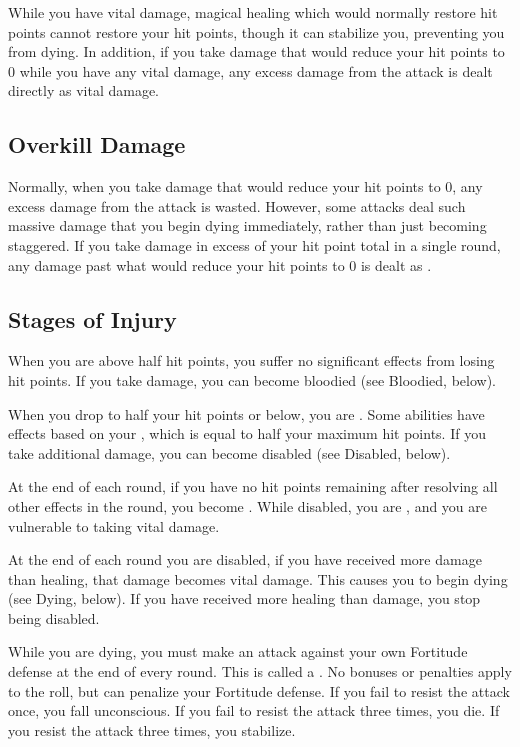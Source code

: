         While you have vital damage, magical healing which would normally restore hit points cannot restore your hit points, though it can stabilize you, preventing you from dying.
        In addition, if you take damage that would reduce your hit points to 0 while you have any vital damage, any excess damage from the attack is dealt directly as vital damage.

    \subsection{Overkill Damage}\label{Overkill Damage}
        Normally, when you take damage that would reduce your hit points to 0, any excess damage from the attack is wasted.
        However, some attacks deal such massive damage that you begin dying immediately, rather than just becoming staggered.
        If you take damage in excess of your  hit point total in a single round, any damage past what would reduce your hit points to 0 is dealt as .

    \subsection{Stages of Injury}

         When you are above half hit points, you suffer no significant effects from losing hit points.
        If you take damage, you can become bloodied (see Bloodied, below).

         When you drop to half your hit points or below, you are \bloodied.
        Some abilities have effects based on your , which is equal to half your maximum hit points.
        If you take additional damage, you can become disabled (see Disabled, below).

        \label{Disabled} At the end of each round, if you have no hit points remaining after resolving all other effects in the round, you become \disabled.
        While disabled, you are \staggered, and you are vulnerable to taking vital damage.

        At the end of each round you are disabled, if you have received more damage than healing, that damage becomes vital damage.
        This causes you to begin dying (see Dying, below).
        If you have received more healing than damage, you stop being disabled.

        \label{Dying} While you are dying, you must make an attack against your own Fortitude defense at the end of every round.
        This is called a .
        No bonuses or penalties apply to the roll, but  can penalize your Fortitude defense.
        If you fail to resist the attack once, you fall unconscious.
        If you fail to resist the attack three times, you die.
        If you resist the attack three times, you stabilize.

